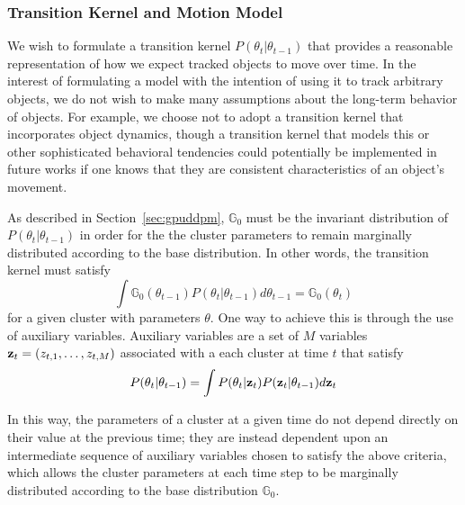 \documentclass[smallcondensed, final]{svjour3}
\begin{document}






\subsubsection{Transition Kernel and Motion Model}

We wish to formulate a transition kernel $P(\theta_{t} | \theta_{t-1})$ that provides a reasonable representation of how we expect tracked objects to move over time. In the interest of formulating a model with the intention of using it to track arbitrary objects, we do not wish to make many assumptions about the long-term behavior of objects. For example, we choose not to adopt a transition kernel that incorporates object dynamics, though a transition kernel that models this or other sophisticated behavioral tendencies could potentially be implemented in future works if one knows that they are consistent characteristics of an object's movement.

As described in Section~\ref{sec:gpuddpm}, $\mathbb{G}_{0}$ must be the invariant distribution of $P(\theta_{t} | \theta_{t-1})$ in order for the the cluster parameters to remain marginally distributed according to the base distribution. In other words, the transition kernel must satisfy
\begin{equation}
\int \mathbb{G}_{0}(\theta_{t-1})P(\theta_{t} | \theta_{t-1}) d\theta_{t-1} = \mathbb{G}_{0}(\theta_{t})
\end{equation}
for a given cluster with parameters $\theta$. One way to achieve this is through the use of auxiliary variables. Auxiliary variables are a set of $M$ variables $\bold{z}_{t} = (z_{t,1}, \ldots, z_{t,M})$ associated with a each cluster at time $t$ that satisfy
\begin{eqnarray}
P(\theta_{t} | \theta_{t-1}) = \int P(\theta_{t} | \bold{z}_{t}) P(\bold{z}_{t} | \theta_{t-1}) d \bold{z}_{t}  %
\end{eqnarray}

In this way, the parameters of a cluster at a given time do not depend directly on their value at the previous time; they are instead dependent upon an intermediate sequence of auxiliary variables chosen to satisfy the above criteria, which allows the cluster parameters at each time step to be marginally distributed according to the base distribution $\mathbb{G}_{0}$.
\end{document}
